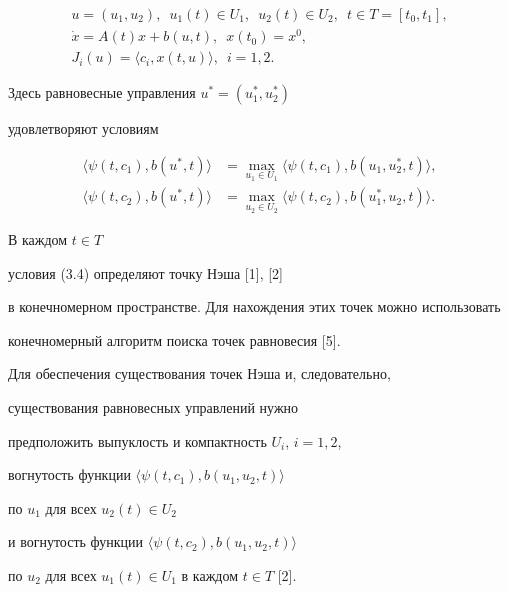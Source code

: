 \begin{exam}


\begin{gather*}


u=(u_1,u_2),\ \; u_1(t)\in U_1,\ \; u_2(t)\in U_2,\ \; t\in T=[t_0,t_1],\\


%


\Dot x=A(t)x+b(u,t),\ \; x(t_0)=x^0, \\


%


J_i(u)=\langle c_i,x(t,u)\rangle,\ \; i=1,2.


\end{gather*}


Здесь равновесные управления $u^{\ast}=(u_1^{\ast},u_2^{\ast})$


удовлетворяют условиям


\begin{equation}


\begin{split}


\langle\psi(t,c_1),b(u^{\ast},t)\rangle&=


\max\limits_{{u_1\in U_1}}\langle\psi(t,c_1),b(u_1,u_2^{\ast},t)\rangle,\\


%


\langle\psi(t,c_2),b(u^{\ast},t)\rangle&=


\max\limits_{{u_2\in U_2}}\langle\psi(t,c_2),b(u_1^{\ast},u_2,t)\rangle. 


\end{split}


\end{equation}


В каждом $t\in T$


условия (3.4) определяют точку Нэша [1], [2]


в конечномерном пространстве. Для нахождения этих точек можно использовать 


конечномерный алгоритм поиска точек равновесия [5].


Для обеспечения существования точек Нэша и, следовательно, 


существования равновесных управлений нужно 


предположить выпуклость и компактность $U_{i}$, $i=1,2$,


вогнутость функции $\langle\psi(t,c_1),b(u_1,u_2,t)\rangle$


по $u_1$ для всех $u_2(t)\in U_2$


и вогнутость функции $\langle\psi(t,c_2),b(u_1,u_2,t)\rangle$


по $u_2$ для всех $u_1(t)\in U_1$ в каждом $t\in T$ [2].


\end{exam}





